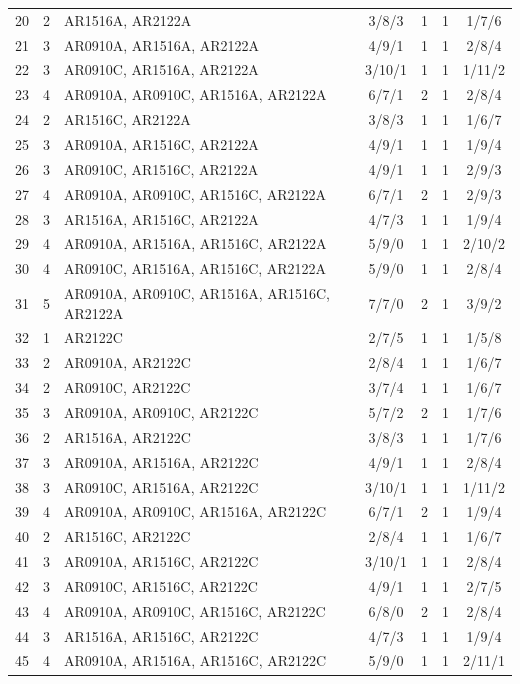 {\begin{longtable}{rcp{5.4cm}cccc}
20 & 2 & AR1516A, AR2122A & 3/8/3 & 1 & 1 & 1/7/6 \\
21 & 3 & AR0910A, AR1516A, AR2122A & 4/9/1 & 1 & 1 & 2/8/4 \\
22 & 3 & AR0910C, AR1516A, AR2122A & 3/10/1 & 1 & 1 & 1/11/2 \\
23 & 4 & AR0910A, AR0910C, AR1516A, AR2122A & 6/7/1 & 2 & 1 & 2/8/4 \\
24 & 2 & AR1516C, AR2122A & 3/8/3 & 1 & 1 & 1/6/7 \\
25 & 3 & AR0910A, AR1516C, AR2122A & 4/9/1 & 1 & 1 & 1/9/4 \\
26 & 3 & AR0910C, AR1516C, AR2122A & 4/9/1 & 1 & 1 & 2/9/3 \\
27 & 4 & AR0910A, AR0910C, AR1516C, AR2122A & 6/7/1 & 2 & 1 & 2/9/3 \\
28 & 3 & AR1516A, AR1516C, AR2122A & 4/7/3 & 1 & 1 & 1/9/4 \\
29 & 4 & AR0910A, AR1516A, AR1516C, AR2122A & 5/9/0 & 1 & 1 & 2/10/2 \\
30 & 4 & AR0910C, AR1516A, AR1516C, AR2122A & 5/9/0 & 1 & 1 & 2/8/4 \\
31 & 5 & AR0910A, AR0910C, AR1516A, AR1516C, AR2122A & 7/7/0 & 2 & 1 & 3/9/2 \\
32 & 1 & AR2122C & 2/7/5 & 1 & 1 & 1/5/8 \\
33 & 2 & AR0910A, AR2122C & 2/8/4 & 1 & 1 & 1/6/7 \\
34 & 2 & AR0910C, AR2122C & 3/7/4 & 1 & 1 & 1/6/7 \\
35 & 3 & AR0910A, AR0910C, AR2122C & 5/7/2 & 2 & 1 & 1/7/6 \\
36 & 2 & AR1516A, AR2122C & 3/8/3 & 1 & 1 & 1/7/6 \\
37 & 3 & AR0910A, AR1516A, AR2122C & 4/9/1 & 1 & 1 & 2/8/4 \\
38 & 3 & AR0910C, AR1516A, AR2122C & 3/10/1 & 1 & 1 & 1/11/2 \\
39 & 4 & AR0910A, AR0910C, AR1516A, AR2122C & 6/7/1 & 2 & 1 & 1/9/4 \\
40 & 2 & AR1516C, AR2122C & 2/8/4 & 1 & 1 & 1/6/7 \\
41 & 3 & AR0910A, AR1516C, AR2122C & 3/10/1 & 1 & 1 & 2/8/4 \\
42 & 3 & AR0910C, AR1516C, AR2122C & 4/9/1 & 1 & 1 & 2/7/5 \\
43 & 4 & AR0910A, AR0910C, AR1516C, AR2122C & 6/8/0 & 2 & 1 & 2/8/4 \\
44 & 3 & AR1516A, AR1516C, AR2122C & 4/7/3 & 1 & 1 & 1/9/4 \\
45 & 4 & AR0910A, AR1516A, AR1516C, AR2122C & 5/9/0 & 1 & 1 & 2/11/1 \\

\end{longtable}}
